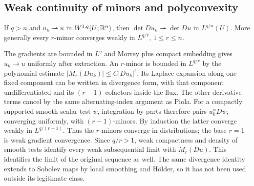 \subsection{Weak continuity of minors and polyconvexity}
\Needspace{55mm}
\begin{lemma}
\label{lem:8-det-weak}
If $q>n$ and $u_k\rightharpoonup u$ in $W^{1,q}(U;\mathbb{R}^n)$, then
$\det Du_k\rightharpoonup\det Du$ in $L^{q/n}(U)$.
More generally every $r$-minor converges weakly in $L^{q/r}$, $1\leq r\leq n$.
\end{lemma}
\begin{expandedproof}
The gradients are bounded in $L^q$ and Morrey plus compact embedding gives
$u_k\to u$ uniformly after extraction. An $r$-minor is bounded in
$L^{q/r}$ by the polynomial estimate $|M_r(Du_k)|\leq C|Du_k|^r$.
Its Laplace expansion along one fixed component can be written in
 divergence form, with that component undifferentiated and its
$(r-1)$-cofactors inside the flux. The other derivative terms cancel by
the same alternating-index argument as Piola.
For a compactly supported smooth scalar test $\psi$, integration by parts
therefore pairs $u_k^\alpha D\psi$, converging uniformly, with
$(r-1)$-minors. By induction the latter converge weakly in
$L^{q/(r-1)}$. Thus the $r$-minors converge in distributions; the base
$r=1$ is weak gradient convergence. Since $q/r>1$, weak compactness
and density of smooth tests identify every weak subsequential limit
with $M_r(Du)$. This identifies the limit of the original sequence as well.
The same divergence identity extends to Sobolev maps by local smoothing
and H\"older, so it has not been used outside its legitimate class.
\end{expandedproof}
\Needspace{55mm}

